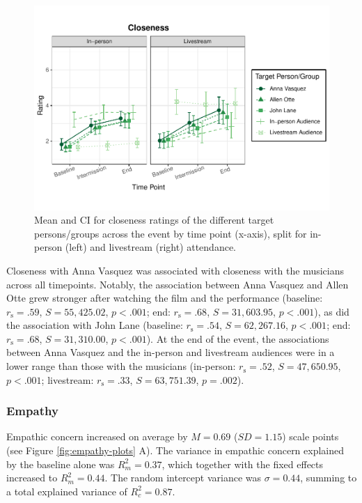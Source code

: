 \documentclass[
  man,floatsintext]{apa6}
\begin{document}
\begin{figure}
\includegraphics[width=1\linewidth]{Schlichting_MSc_Thesis_files/figure-latex/closeness-lineplots-1} \caption{Mean and CI for closeness ratings of the different target persons/groups across the event by time point (x-axis), split for in-person (left) and livestream (right) attendance.}\label{fig:closeness-lineplots}
\end{figure}

Closeness with Anna Vasquez was associated with closeness with the musicians across all timepoints. Notably, the association between Anna Vasquez and Allen Otte grew stronger after watching the film and the performance (baseline: \(r_{\mathrm{s}} = .59\), \(S = 55,425.02\), \(p < .001\); end: \(r_{\mathrm{s}} = .68\), \(S = 31,603.95\), \(p < .001\)), as did the association with John Lane (baseline: \(r_{\mathrm{s}} = .54\), \(S = 62,267.16\), \(p < .001\); end: \(r_{\mathrm{s}} = .68\), \(S = 31,310.00\), \(p < .001\)). At the end of the event, the associations between Anna Vasquez and the in-person and livestream audiences were in a lower range than those with the musicians (in-person: \(r_{\mathrm{s}} = .52\), \(S = 47,650.95\), \(p < .001\); livestream: \(r_{\mathrm{s}} = .33\), \(S = 63,751.39\), \(p = .002\)).

\subsubsection{Empathy}\label{empathy-1}

Empathic concern increased on average by \(M = 0.69\) (\(SD = 1.15\)) scale points (see Figure \ref{fig:empathy-plots} A). The variance in empathic concern explained by the baseline alone was \(R_{m}^2 = 0.37\), which together with the fixed effects increased to \(R_{m}^2 = 0.44\). The random intercept variance was \(\sigma = 0.44\), summing to a total explained variance of \(R_{c}^2 = 0.87\).
\end{document}

